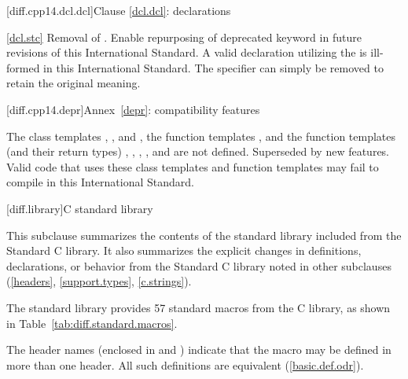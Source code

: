 [diff.cpp14.dcl.dcl]{Clause \ref{dcl.dcl}: declarations}

\ref{dcl.stc}
%
\change Removal of  .
\rationale Enable repurposing of deprecated keyword in future revisions of this International Standard.
\effect
A valid \CppXIV declaration utilizing the 
 is ill-formed in this International Standard.
The specifier can simply be removed to retain the original meaning.

[diff.cpp14.depr]{Annex~\ref{depr}: compatibility features}

\change
The class templates
,
, and
,
the function templates
,
and the function templates (and their return types)
,
,
,
, and
are not defined.
\rationale Superseded by new features.
\effect Valid \CppXIV code that uses these class templates
and function templates may fail to compile in this International Standard.


[diff.library]{C standard library}
%

\pnum
This subclause summarizes the contents of the \Cpp standard library
included from the Standard C library.
It also summarizes the explicit changes in definitions,
declarations, or behavior from the Standard C library
noted in other subclauses (\ref{headers}, \ref{support.types}, \ref{c.strings}).

\pnum
The \Cpp standard library provides 57 standard macros from the C library,
as shown in Table~\ref{tab:diff.standard.macros}.

\pnum
The header names (enclosed in
\tcode{<}
and
\tcode{>})
indicate that the macro may be defined in more than one header.
All such definitions are equivalent (\ref{basic.def.odr}).

